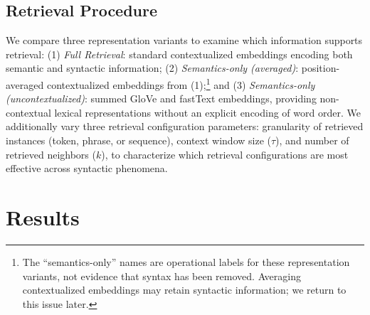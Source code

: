 \subsection{Retrieval Procedure}
\label{subsec:datastores}

We compare three representation variants to examine which information supports retrieval: (1) \textit{Full Retrieval}: standard contextualized embeddings encoding both semantic and syntactic information; (2) \textit{Semantics-only (averaged)}: position-averaged contextualized embeddings from (1);\footnote{The ``semantics-only'' names are operational labels for these representation variants, not evidence that syntax has been removed. Averaging contextualized embeddings may retain syntactic information; we return to this issue later.} and (3) \textit{Semantics-only (uncontextualized)}: summed GloVe \citep{pennington2014glove} and fastText \citep{bojanowski2017enriching} embeddings, providing non-contextual lexical representations without an explicit encoding of word order. We additionally vary three retrieval configuration parameters: granularity of retrieved instances (token, phrase, or sequence), context window size ($\tau$), and number of retrieved neighbors ($k$), to characterize which retrieval configurations are most effective across syntactic phenomena.



\section{Results}


